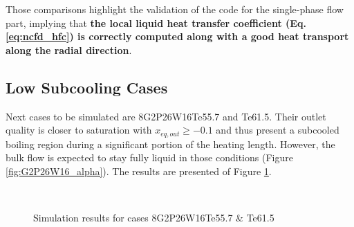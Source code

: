 \npar

Those comparisons highlight the validation of the code for the single-phase flow part, implying that \textbf{the local liquid heat transfer coefficient (Eq. \ref{eq:ncfd_hfc}) is correctly computed along with a good heat transport along the radial direction}.


\subsection{Low Subcooling Cases}

Next cases to be simulated are 8G2P26W16Te55.7 and Te61.5. Their outlet quality is closer to saturation with $x_{eq,out} \geq -0.1$ and thus present a subcooled boiling region during a significant portion of the heating length. However, the bulk flow is expected to stay fully liquid in those conditions (Figure \ref{fig:G2P26W16_alpha}). The results are presented of Figure \ref{fig:deb_cfd_8T55_T61}.


\begin{figure}[!h]
\centering
{}
\\
\caption{Simulation results for cases 8G2P26W16Te55.7 \& Te61.5}
\label{fig:deb_cfd_8T55_T61}
\end{figure}

